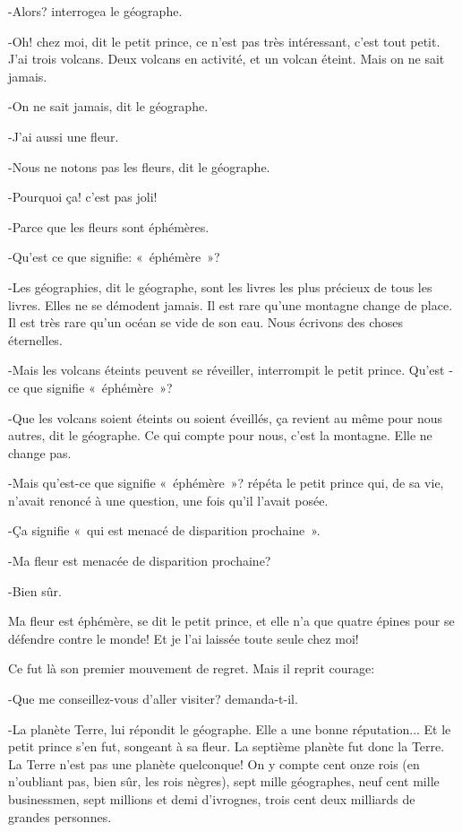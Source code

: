 \documentclass{report}
\begin{document}
-Alors? interrogea le géographe.

-Oh! chez moi, dit le petit prince, ce n'est pas très intéressant, c'est tout petit. J'ai trois volcans. Deux volcans en activité, et un volcan éteint. Mais on ne sait jamais.

-On ne sait jamais, dit le géographe.

-J'ai aussi une fleur.

-Nous ne notons pas les fleurs, dit le géographe.

-Pourquoi ça! c'est pas joli!


-Parce que les fleurs sont éphémères.

-Qu'est ce que signifie: «~éphémère~»?

-Les géographies, dit le géographe, sont les livres les plus précieux de tous les livres. Elles ne se démodent jamais. Il est rare qu'une montagne change de place. Il est très rare qu'un océan se vide de son eau. Nous écrivons des choses éternelles.

-Mais les volcans éteints peuvent se réveiller, interrompit le petit prince. Qu'est -ce que signifie «~éphémère~»?

-Que les volcans soient éteints ou soient éveillés, ça revient au même pour nous autres, dit le géographe. Ce qui compte pour nous, c'est la montagne. Elle ne change pas.

-Mais qu'est-ce que signifie «~éphémère~»? répéta le petit prince qui, de sa vie, n'avait renoncé à une question, une fois qu'il l'avait posée.

-Ça signifie «~qui est menacé de disparition prochaine~».

-Ma fleur est menacée de disparition prochaine?

-Bien sûr.

Ma fleur est éphémère, se dit le petit prince, et elle n'a que quatre épines pour se défendre contre le monde! Et je l'ai laissée toute seule chez moi!

Ce fut là son premier mouvement de regret. Mais il reprit courage:

-Que me conseillez-vous d'aller visiter? demanda-t-il.

-La planète Terre, lui répondit le géographe. Elle a une bonne réputation...
Et le petit prince s'en fut, songeant à sa fleur.
\parachapter{} %
La septième planète fut donc la Terre.
La Terre n'est pas une planète quelconque! On y compte cent onze rois (en n'oubliant pas, bien sûr, les rois nègres), sept mille géographes, neuf cent mille businessmen, sept millions et demi d'ivrognes, trois cent deux milliards de grandes personnes.
\end{document}
